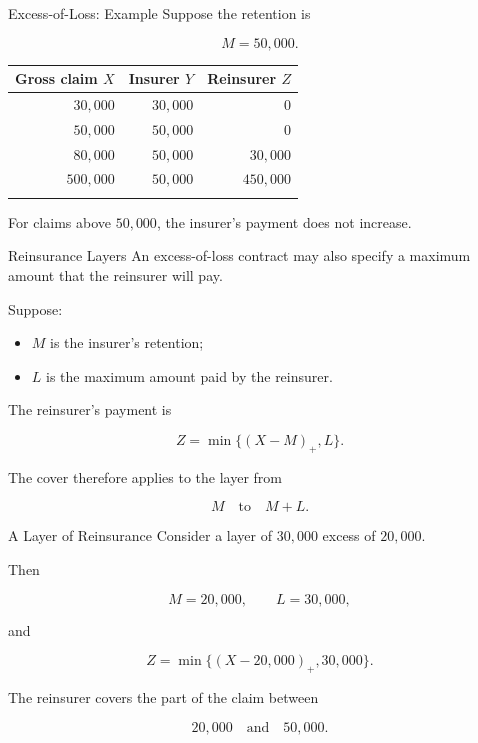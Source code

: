 \documentclass[
  ignorenonframetext,
  aspectratio=169,
]{beamer}
\newcounter{none} %
\providecommand{\tightlist}{%
  \setlength{\itemsep}{0pt}\setlength{\parskip}{0pt}}
\begin{document}
\begin{frame}{Excess-of-Loss: Example}
\protect{}\label{excess-of-loss-example-1}
Suppose the retention is

\[
M=50{,}000.
\]

{\def\LTcaptype{none} %
\begin{longtable}[]{@{}rrr@{}}
\toprule\noalign{}
Gross claim \(X\) & Insurer \(Y\) & Reinsurer \(Z\) \\
\midrule\noalign{}
\endhead
\(30{,}000\) & \(30{,}000\) & \(0\) \\
\(50{,}000\) & \(50{,}000\) & \(0\) \\
\(80{,}000\) & \(50{,}000\) & \(30{,}000\) \\
\(500{,}000\) & \(50{,}000\) & \(450{,}000\) \\
\bottomrule\noalign{}
\end{longtable}
}

For claims above \(50{,}000\), the insurer's payment does not increase.
\end{frame}

\begin{frame}{Reinsurance Layers}
\protect{}\label{reinsurance-layers}
An excess-of-loss contract may also specify a maximum amount that the
reinsurer will pay.

Suppose:

\begin{itemize}
\tightlist
\item
  \(M\) is the insurer's retention;
\item
  \(L\) is the maximum amount paid by the reinsurer.
\end{itemize}

The reinsurer's payment is

\[
\boxed{
Z=\min\{(X-M)_+,L\}.
}
\]

The cover therefore applies to the layer from

\[
M
\quad\text{to}\quad
M+L.
\]
\end{frame}

\begin{frame}{A Layer of Reinsurance}
\protect{}\label{a-layer-of-reinsurance}
Consider a layer of \(30{,}000\) excess of \(20{,}000\).

Then

\[
M=20{,}000,
\qquad
L=30{,}000,
\]

and

\[
Z=\min\{(X-20{,}000)_+,30{,}000\}.
\]

The reinsurer covers the part of the claim between

\[
20{,}000
\quad\text{and}\quad
50{,}000.
\]
\end{frame}
\end{document}
